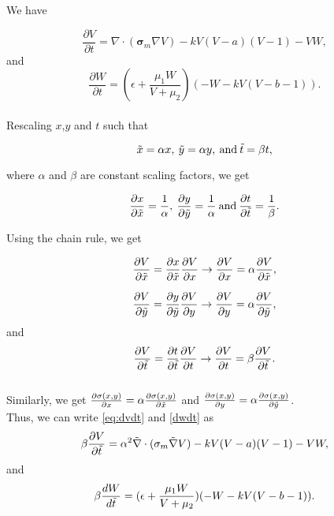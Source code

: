 \documentclass{article}
\begin{document}
We have 

\begin{equation}
\label{eq:dvdt}
    \frac{\partial V}{\partial t}=\nabla \cdot (\mathbf{\sigma}_m \nabla V) - kV(V-a)(V-1)-VW,
\end{equation}
and
\begin{equation}
\label{dwdt}
    \frac{\partial W}{\partial t}= (\epsilon + \frac{\mu_1W}{V+\mu_2})(-W-kV(V-b-1)).
\end{equation}
\\

Rescaling $x$,$y$ and $t$ such that

\begin{equation}
    \Tilde{x}=\alpha x,\: \Tilde{y}=\alpha y,\: \text{and}\: \Tilde{t}=\beta t,
\end{equation}



where $\alpha$ and $\beta$ are constant scaling factors, we get



\begin{equation}
    \frac{\partial x}{\partial \Tilde{x}} = \frac{1}{\alpha},\: \frac{\partial y}{\partial \Tilde{y}} = \frac{1}{\alpha}\: \text{and}\: \frac{\partial t}{\partial \Tilde{t}} = \frac{1}{\beta}.
\end{equation}

Using the chain rule, we get

\begin{equation}
    \frac{\partial V}{\partial \Tilde{x}}=\frac{\partial x}{\partial \Tilde{x}}\frac{\partial V}{\partial x} \rightarrow \frac{\partial V}{\partial x}=\alpha \frac{\partial V}{\partial \Tilde{x}},
\end{equation}

\begin{equation}
    \frac{\partial V}{\partial \Tilde{y}}=\frac{\partial y}{\partial \Tilde{y}}\frac{\partial V}{\partial y} \rightarrow \frac{\partial V}{\partial y}= \alpha \frac{\partial V}{\partial \Tilde{y}},
\end{equation}
and 
\begin{equation}
    \frac{\partial V}{\partial \Tilde{t}}=\frac{\partial t}{\partial \Tilde{t}}\frac{\partial V}{\partial t} \rightarrow \frac{\partial V}{\partial t} = \beta \frac{\partial V}{\partial \Tilde{t}}.
\end{equation}
\\

Similarly, we get $\frac{\partial \sigma(x,y)}{\partial x} = \alpha \frac{\partial \sigma(x,y)}{\partial \Tilde{x}}$ and $\frac{\partial \sigma(x,y)}{\partial y} = \alpha \frac{\partial \sigma(x,y)}{\partial \Tilde{y}}$.\\

Thus, we can write \eqref{eq:dvdt} and \eqref{dwdt} as
\begin{equation}
\label{eq:dvdt}
    \beta \frac{\partial V}{\partial \Tilde{t}}=\alpha^2\Tilde{\nabla} \cdot (\mathbf{\sigma}_m \Tilde{\nabla} V) - kV(V-a)(V-1)-VW,
\end{equation}
and
\begin{equation}
\label{dwdt}
    \beta \frac{dW}{d \Tilde{t}}= (\epsilon + \frac{\mu_1W}{V+\mu_2})(-W-kV(V-b-1)).
\end{equation}
\end{document}
